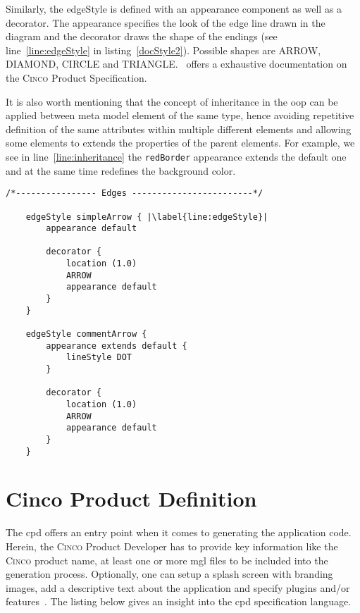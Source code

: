 Similarly, the edgeStyle is defined with an appearance component as well as a decorator. The appearance specifies the look of the edge line drawn in the diagram and the decorator draws the shape of the endings (see line~\ref{line:edgeStyle} in listing~\ref{docStyle2}). Possible shapes are ARROW, DIAMOND, CIRCLE and TRIANGLE\@.~\cite{gitlabcinco} offers a exhaustive documentation on the \textsc{Cinco} Product Specification.

It is also worth mentioning that the concept of inheritance in the \acrfull{oop} can be applied between meta model element of the same type, hence avoiding repetitive definition of the same attributes within multiple different elements and allowing some elements to extends the properties of the parent elements. For example, we see in line~\ref{line:inheritance} the \lstinline{redBorder} appearance extends the default one and at the same time redefines the background color.

\begin{lstlisting}[language=MGL, caption={Doc.style part 2}, label=docStyle2, escapechar=|, name=docMSL]
    /*---------------- Edges ------------------------*/

    edgeStyle simpleArrow { |\label{line:edgeStyle}|
        appearance default

        decorator {
            location (1.0)
            ARROW
            appearance default
        }
    }

    edgeStyle commentArrow {
        appearance extends default {
            lineStyle DOT
        }

        decorator {
            location (1.0)
            ARROW
            appearance default
        }
    }
\end{lstlisting}

\section{Cinco Product Definition}\label{sec:CPD}

The \acrfull{cpd} offers an entry point when it comes to generating the application code. Herein, the \textsc{Cinco} Product Developer has to provide key information like the \textsc{Cinco} product name, at least one or more \acrshort{mgl} files to be included into the generation process. Optionally, one can setup a splash screen with branding images, add a descriptive text about the application and specify plugins and/or features~\cite{gitlabcinco}.
The listing below gives an insight into the \acrshort{cpd} specification language.

